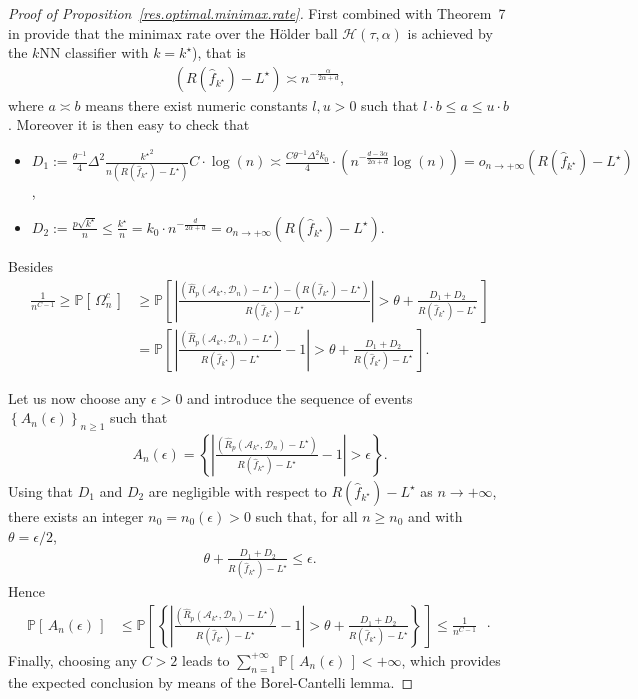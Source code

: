 \documentclass[twoside,11pt]{article}
\numberwithin{equation}{section}
\newcommand{\1}{\mathds{1}}%
\newcommand{\paren}[1]{\left( #1 \right)}
\newcommand{\croch}[1]{\left[\, #1 \,\right]}
\newcommand{\acc}[1]{\left\{ #1 \right\}}
\newcommand{\abs}[1]{\left\lvert #1 \right\rvert} %
\newcommand{\defegal}{:=} %
\renewcommand{\P}{\mathbb{P}}
\newcommand{\Rh}{\widehat{R}}
\newcommand{\Rhp}{\Rh_p}
\newcommand{\Dn}{\mathcal{D}_n}
\newcommand{\A}{\mathcal{A}}
\numberwithin{equation}{section}
\theoremstyle{plain}
\begin{document}
\begin{proof}[Proof of Proposition~\ref{res.optimal.minimax.rate}]
 {First \citet{Yang_1999} combined with Theorem~7 in \citet{Chaudhuri_Dasgupta2014} provide that the minimax rate over the H\"older ball $\mathcal{H}(\tau,\alpha)$ is achieved by the $k$NN classifier with $k=k^\star$), that is
\begin{align*}
\paren{R(\hat{f}_{k^\star}) - L^\star} \asymp n^{-\frac{\alpha}{2\alpha+d}} ,
\end{align*}
where $a\asymp b$ means there exist numeric constants $l,u>0$ such that $l\cdot b \leq a \leq u\cdot b$.
%
Moreover it is then easy to check that
\begin{itemize}
	\item $D_1 \defegal \frac{\theta^{-1}}{4} \Delta^2 \frac{{k^\star}^2}{n\paren{R(\hat{f}_{k^\star}) - L^\star}} C \cdot \log(n)  \asymp \frac{ C \theta^{-1}\Delta^2 k_0}{4}  \cdot \paren{ n^{ -\frac{ d-3\alpha }{2\alpha+d}}  \log(n) }  = o_{n\to +\infty}\paren{R(\hat{f}_{k^\star}) - L^\star}$,
	\item 	 $D_2 \defegal \frac{p\sqrt{k^\star}}{n} \leq \frac{k^\star}{n} = k_0 \cdot n^{-\frac{d}{2\alpha+d}}= o_{n\to +\infty}\paren{ R(\hat{f}_{k^\star}) - L^\star } $.
\end{itemize}
%
Besides
\begin{align*}
\frac{1}{n^{C-1}} \geq \P\croch{ \Omega_n^c}  & \geq  \P\croch{  \abs{ \frac{ \paren{ \Rhp(\A_{k^\star},\Dn)- L^\star} - \paren{R(\hat{f}_{k^\star}) - L^\star}}{R(\hat{f}_{k^\star}) - L^\star} } > \theta + \frac{ D_1 + D_2 }{ R(\hat{f}_{k^\star}) - L^\star } } \\
%
& = \P\croch{  \abs{ \frac{ \paren{ \Rhp(\A_{k^\star},\Dn)- L^\star} }{R(\hat{f}_{k^\star}) - L^\star} - 1 } > \theta + \frac{ D_1 + D_2 }{ R(\hat{f}_{k^\star}) - L^\star } } .
\end{align*}
}

 {Let us now choose any $\epsilon>0$ and introduce the sequence of events $\acc{A_n(\epsilon)}_{n\geq 1}$ such that
\begin{align*}
A_n(\epsilon) = \acc{ \abs{ \frac{ \paren{ \Rhp(\A_{k^\star},\Dn)- L^\star} }{R(\hat{f}_{k^\star}) - L^\star} - 1 } > \epsilon } .
\end{align*}
%
Using that $ D_1$ and $ D_2$ are negligible with respect to $R(\hat{f}_{k^\star}) - L^\star$ as $n\to +\infty$, there exists an integer $n_0 = n_0(\epsilon)>0$ such that, for all $n\geq n_0$ and with $\theta = \epsilon/2$,
\begin{align*}
\theta + \frac{ D_1 + D_2 }{ R(\hat{f}_{k^\star}) - L^\star } \leq \epsilon.
\end{align*}
%
Hence
\begin{align*}
\P\croch{ A_n(\epsilon) } & \leq \P\croch{ \acc{ \abs{ \frac{ \paren{ \Rhp(\A_{k^\star},\Dn)- L^\star} }{R(\hat{f}_{k^\star}) - L^\star} - 1 } > \theta + \frac{ D_1 + D_2 }{ R(\hat{f}_{k^\star}) - L^\star } } } \leq \frac{1}{n^{C-1}}\enspace\cdot
\end{align*}
%
Finally, choosing any $C>2$ leads to $\sum_{n=1}^{+\infty} \P\croch{ A_n(\epsilon) } <+\infty $, which provides the expected conclusion by means of the Borel-Cantelli lemma.}
%
\end{proof}
\end{document}

